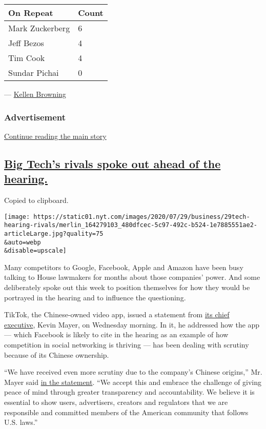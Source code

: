 \begin{longtable}[]{@{}ll@{}}
\toprule
\textbf{On Repeat} & \textbf{Count}\tabularnewline
\midrule
\endhead
Mark Zuckerberg & 6\tabularnewline
Jeff Bezos & 4\tabularnewline
Tim Cook & 4\tabularnewline
Sundar Pichai & 0\tabularnewline
\bottomrule
\end{longtable}

--- \href{https://www.nytimes.com/by/kellen-browning}{Kellen Browning}

\hypertarget{advertisement-1}{%
\subsubsection{Advertisement}\label{advertisement-1}}

\protect\hyperlink{after-dfp-ad-mid2}{Continue reading the main story}

\hypertarget{big-techs-rivals-spoke-out-ahead-of-the-hearing}{%
\subsection{\texorpdfstring{\protect\hyperlink{big-techs-rivals-spoke-out-ahead-of-the-hearing}{Big
Tech's rivals spoke out ahead of the
hearing.}}{Big Tech's rivals spoke out ahead of the hearing.}}\label{big-techs-rivals-spoke-out-ahead-of-the-hearing}}

Copied to clipboard.

\texttt{[image: https://static01.nyt.com/images/2020/07/29/business/29tech-hearing-rivals/merlin\_164279103\_480dfcec-5c97-492c-b524-1e7885551ae2-articleLarge.jpg?quality=75\\\&auto=webp\\\&disable=upscale]}

Many competitors to Google, Facebook, Apple and Amazon have been busy
talking to House lawmakers for months about those companies' power. And
some deliberately spoke out this week to position themselves for how
they would be portrayed in the hearing and to influence the questioning.

TikTok, the Chinese-owned video app, issued a statement from
\href{https://www.nytimes.com/2020/05/18/business/media/tiktok-ceo-kevin-mayer.html}{its
chief executive}, Kevin Mayer, on Wednesday morning. In it, he addressed
how the app --- which Facebook is likely to cite in the hearing as an
example of how competition in social networking is thriving --- has been
dealing with scrutiny because of its Chinese ownership.

``We have received even more scrutiny due to the company's Chinese
origins,'' Mr. Mayer said
\href{https://newsroom.tiktok.com/en-us/fair-competition-and-transparency-benefits-us-all}{in
the statement}. ``We accept this and embrace the challenge of giving
peace of mind through greater transparency and accountability. We
believe it is essential to show users, advertisers, creators and
regulators that we are responsible and committed members of the American
community that follows U.S. laws.''

